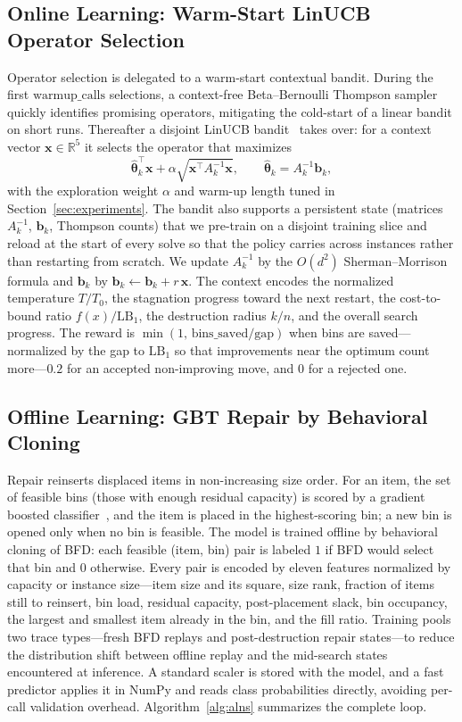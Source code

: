 \documentclass[conference]{IEEEtran}
\begin{document}
\subsection{Online Learning: Warm-Start LinUCB Operator Selection}
Operator selection is delegated to a warm-start contextual bandit. During the
first $\mathrm{warmup\_calls}$ selections, a context-free Beta--Bernoulli Thompson
sampler quickly identifies promising operators, mitigating the cold-start of a
linear bandit on short runs. Thereafter a disjoint LinUCB bandit~\cite{bChu}
takes over: for a context vector $\mathbf{x}\in\mathbb{R}^5$ it selects the
operator that maximizes
\begin{equation}
	\hat{\boldsymbol{\theta}}_k^\top \mathbf{x}
	+ \alpha\sqrt{\mathbf{x}^\top A_k^{-1}\mathbf{x}},
	\qquad \hat{\boldsymbol{\theta}}_k=A_k^{-1}\mathbf{b}_k,\label{eq:ucb}
\end{equation}
with the exploration weight $\alpha$ and warm-up length tuned in
Section~\ref{sec:experiments}. The bandit also supports a persistent state
(matrices $A_k^{-1}$, $\mathbf{b}_k$, Thompson counts) that we pre-train on a
disjoint training slice and reload at the start of every solve so that the
policy carries across instances rather than restarting from scratch. We update
$A_k^{-1}$ by the $O(d^2)$ Sherman--Morrison formula
and $\mathbf{b}_k$ by $\mathbf{b}_k\leftarrow\mathbf{b}_k+r\,\mathbf{x}$. The
context encodes the normalized temperature $T/T_0$, the stagnation progress toward
the next restart, the cost-to-bound ratio $f(x)/\mathrm{LB}_1$, the destruction
radius $k/n$, and the overall search progress. The reward is
$\min(1,\,\text{bins\_saved}/\text{gap})$ when bins are saved---normalized by the
gap to $\mathrm{LB}_1$ so that improvements near the optimum count more---$0.2$ for
an accepted non-improving move, and $0$ for a rejected one.

\subsection{Offline Learning: GBT Repair by Behavioral Cloning}
Repair reinserts displaced items in non-increasing size order. For an item, the
set of feasible bins (those with enough residual capacity) is scored by a gradient
boosted classifier~\cite{bFriedman}, and the item is placed in the highest-scoring
bin; a new bin is opened only when no bin is feasible. The model is trained offline
by behavioral cloning of BFD: each feasible (item, bin) pair is labeled $1$ if BFD
would select that bin and $0$ otherwise. Every pair is encoded by eleven features
normalized by capacity or instance size---item size and its square, size rank,
fraction of items still to reinsert, bin load, residual capacity, post-placement
slack, bin occupancy, the largest and smallest item already in the bin, and the
fill ratio. Training pools two trace types---fresh BFD replays and
post-destruction repair states---to reduce the distribution shift between offline
replay and the mid-search states encountered at inference. A standard scaler is
stored with the model, and a fast predictor applies it in NumPy and reads class
probabilities directly, avoiding per-call validation overhead. Algorithm~\ref{alg:alns}
summarizes the complete loop.
\end{document}
